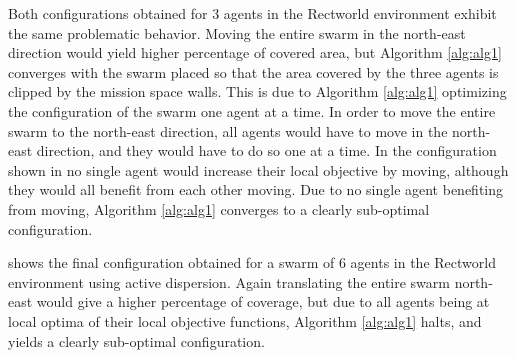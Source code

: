 Both configurations obtained for 3 agents in the Rectworld environment exhibit the same problematic behavior. Moving the entire swarm in the north-east direction would yield higher percentage of covered area,
but Algorithm \ref{alg:alg1} converges with the swarm placed so that the area covered by the three agents is clipped by the mission space walls. This is due to Algorithm \ref{alg:alg1} optimizing
the configuration of the swarm one agent at a time. In order to move the entire swarm to the north-east direction, all agents would have to move in the north-east direction, and they
would have to do so one at a time. In the configuration shown in  no single agent would increase their local objective by moving, although they would all benefit from each other moving.
Due to no single agent benefiting from moving, Algorithm \ref{alg:alg1} converges to a clearly sub-optimal configuration.

 shows the final configuration obtained for a swarm of 6 agents in the Rectworld environment using active dispersion. Again translating the
entire swarm north-east would give a higher percentage of coverage, but due to all agents being at local optima of their local objective functions, Algorithm \ref{alg:alg1} halts, and yields
a clearly sub-optimal configuration.